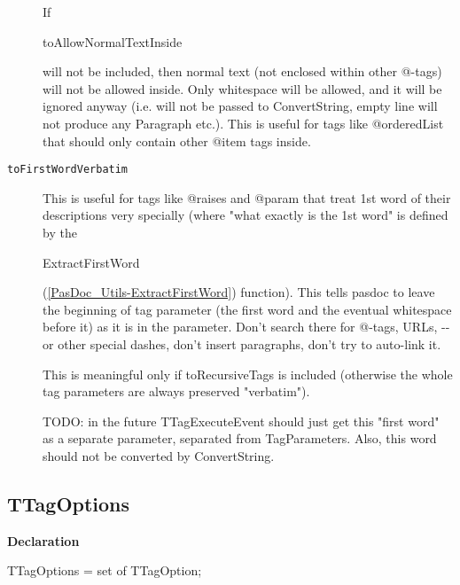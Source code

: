 \documentclass{report}
\newif\ifpdf
\begin{document}
\begin{list}{}
\begin{description}
If \begin{ttfamily}toAllowNormalTextInside\end{ttfamily} will not be included, then normal text (not enclosed within other @{-}tags) will not be allowed inside. Only whitespace will be allowed, and it will be ignored anyway (i.e. will not be passed to ConvertString, empty line will not produce any Paragraph etc.). This is useful for tags like @orderedList that should only contain other @item tags inside.
\item[\texttt{toFirstWordVerbatim}] \label{PasDoc_TagManager-toFirstWordVerbatim}
\index{}
This is useful for tags like @raises and @param that treat 1st word of their descriptions very specially (where "what exactly is the 1st word" is defined by the \begin{ttfamily}ExtractFirstWord\end{ttfamily}(\ref{PasDoc_Utils-ExtractFirstWord}) function). This tells pasdoc to leave the beginning of tag parameter (the first word and the eventual whitespace before it) as it is in the parameter. Don't search there for @{-}tags, URLs, {-}{-} or other special dashes, don't insert paragraphs, don't try to auto{-}link it.

This is meaningful only if toRecursiveTags is included (otherwise the whole tag parameters are always preserved "verbatim").

TODO: in the future TTagExecuteEvent should just get this "first word" as a separate parameter, separated from TagParameters. Also, this word should not be converted by ConvertString.
\end{description}


\end{list}
\ifpdf
\subsection*{\large{\textbf{TTagOptions}}\normalsize\hspace{1ex}\hrulefill}
\else
\subsection*{TTagOptions}
\fi
\label{PasDoc_TagManager-TTagOptions}
\begin{list}{}{
\setlength{\itemindent}{0cm}
\setlength{\listparindent}{0cm}
\setlength{\leftmargin}{\evensidemargin}
\addtolength{\leftmargin}{\tmplength}
\settowidth{\labelsep}{X}
\addtolength{\leftmargin}{\labelsep}
\setlength{\labelwidth}{\tmplength}
}
\item[\textbf{Declaration}\hfill]
\ifpdf
\begin{flushleft}
\fi
\begin{ttfamily}
TTagOptions = set of TTagOption;\end{ttfamily}

\ifpdf
\end{flushleft}
\fi

\end{list}
\ifpdf
\end{document}
